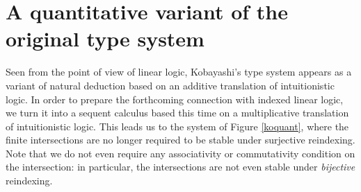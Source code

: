 \documentclass{eptcs}
\begin{document}
\section{A quantitative variant of the original type system}
\label{section/quantitative}
Seen from the point of view of linear logic, Kobayashi's type system appears 
as a variant of natural deduction based on an additive translation of intuitionistic logic.
In order to prepare the forthcoming connection with indexed linear logic, we turn it
into a sequent calculus based this time on a multiplicative translation of intuitionistic logic.
This leads us to the system of Figure \ref{koquant}, where the finite intersections are no longer
required to be stable under surjective reindexing. 
Note that we do not even require any associativity or commutativity condition on the intersection:
in particular, the intersections are not even stable under \emph{bijective} reindexing. 
\end{document}
